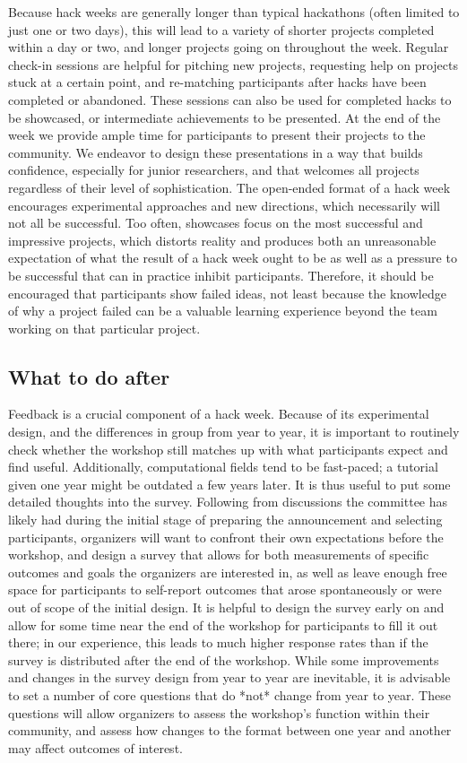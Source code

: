\documentclass{nature}
\begin{document}
Because hack weeks are generally longer than typical hackathons (often limited to just one or two days), this will lead to a variety of shorter projects completed within a day or two, and longer projects going on throughout the week. Regular check-in sessions are helpful for pitching new projects, requesting help on projects stuck at a certain point, and re-matching participants after hacks have been completed or abandoned. These sessions can also be used for completed hacks to be showcased, or intermediate achievements to be presented. At the end of the week we provide ample time for participants to present their projects to the community. We endeavor to design these presentations in a way that builds confidence, especially for junior researchers, and that welcomes all projects regardless of their level of sophistication. The open-ended format of a hack week encourages experimental approaches and new directions, which necessarily will not all be successful. Too often, showcases focus on the most successful and impressive projects, which distorts reality and produces both an unreasonable expectation of what the result of a hack week ought to be as well as a pressure to be successful that can in practice inhibit participants. Therefore, it should be encouraged that participants show failed ideas, not least because the knowledge of why a project failed can be a valuable learning experience beyond the team working on that particular project.

\subsection{What to do after}

Feedback is a crucial component of a hack week. Because of its experimental design, and the differences in group from year to year, it is important to routinely check whether the workshop still matches up with what participants expect and find useful. Additionally, computational fields tend to be fast-paced; a tutorial given one year might be outdated a few years later. It is thus useful to put some detailed thoughts into the survey. Following from discussions the committee has likely had during the initial stage of preparing the announcement and selecting participants, organizers will want to confront their own expectations before the workshop, and design a survey that allows for both measurements of specific outcomes and goals the organizers are interested in, as well as leave enough free space for participants to self-report outcomes that arose spontaneously or were out of scope of the initial design. It is helpful to design the survey early on and allow for some time near the end of the workshop for participants to fill it out there; in our experience, this leads to much higher response rates than if the survey is distributed after the end of the workshop. While some improvements and changes in the survey design from year to year are inevitable, it is advisable to set a number of core questions that do *not* change from year to year. These questions will allow organizers to assess the workshop's function within their community, and assess how changes to the format between one year and another may affect outcomes of interest.
\end{document}
